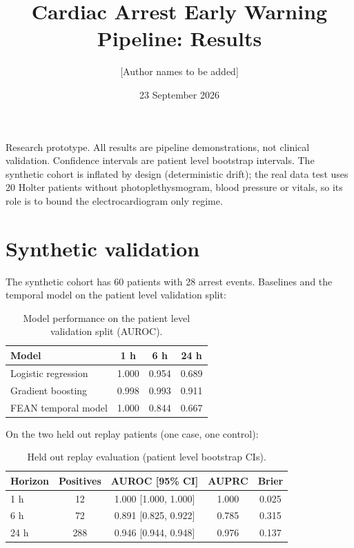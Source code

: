 \documentclass[11pt]{article}
\title{Cardiac Arrest Early Warning Pipeline: Results}
\author{[Author names to be added]}
\date{23 September 2026}
\begin{document}
\maketitle

\begin{center}
\small
Research prototype. All results are pipeline demonstrations, not clinical
validation. Confidence intervals are patient level bootstrap intervals. The
synthetic cohort is inflated by design (deterministic drift); the real data
test uses 20 Holter patients without photoplethysmogram, blood pressure or
vitals, so its role is to bound the electrocardiogram only regime.
\end{center}

\section{Synthetic validation}
The synthetic cohort has 60 patients with 28 arrest events. Baselines and the
temporal model on the patient level validation split:

\begin{table}[h]
\centering
\caption{Model performance on the patient level validation split (AUROC).}
\begin{tabular}{lccc}
\toprule
Model & 1 h & 6 h & 24 h \\
\midrule
Logistic regression & 1.000 & 0.954 & 0.689 \\
Gradient boosting & 0.998 & 0.993 & 0.911 \\
FEAN temporal model & 1.000 & 0.844 & 0.667 \\
\bottomrule
\end{tabular}
\end{table}

On the two held out replay patients (one case, one control):

\begin{table}[h]
\centering
\caption{Held out replay evaluation (patient level bootstrap CIs).}
\begin{tabular}{lcccc}
\toprule
Horizon & Positives & AUROC [95\% CI] & AUPRC & Brier \\
\midrule
1 h & 12 & 1.000 [1.000, 1.000] & 1.000 & 0.025 \\
6 h & 72 & 0.891 [0.825, 0.922] & 0.785 & 0.315 \\
24 h & 288 & 0.946 [0.944, 0.948] & 0.976 & 0.137 \\
\bottomrule
\end{tabular}
\end{table}
\end{document}
